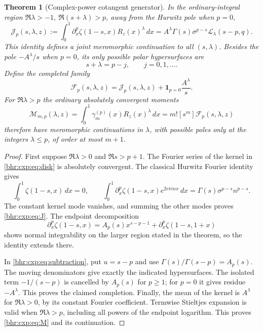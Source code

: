 \documentclass[11pt]{article}
\numberwithin{equation}{section}
\theoremstyle{plain}
\newtheorem{theorem}{Theorem}[section]
\theoremstyle{definition}
\theoremstyle{remark}
\begin{document}
\begin{theorem}[Complex-power cotangent generator]
\label{bhr:cxp:thm:generator}
In the ordinary-integral region
\(\Re\lambda>-1,\ \Re(s+\lambda)>p\), away from the Hurwitz
pole when \(p=0\),
\begin{equation}\label{bhr:cxp:eq:J}
 \mathcal J_p(s,\lambda,z):=
 \int_0^1\partial_x^p\zeta(1-s,x)R_z(x)^\lambda\,dx
 =A^\lambda\Gamma(s)\sigma^{p-s}
       \mathcal L_\lambda(s-p,q).
\end{equation}
This identity defines a joint meromorphic continuation to all
\((s,\lambda)\).  Besides the pole
\(-A^\lambda/s\) when \(p=0\), its only possible polar
hypersurfaces are
\[
 s+\lambda=p-j,\qquad j=0,1,\ldots.
\]
Define the completed family
\begin{equation}\label{bhr:cxp:eq:F}
 \mathcal F_p(s,\lambda,z)=
 \mathcal J_p(s,\lambda,z)
       +\mathbf1_{p=0}\frac{A^\lambda}{s}.
\end{equation}
For \(\Re\lambda>p\) the ordinary absolutely convergent moments
\begin{equation}\label{bhr:cxp:eq:M}
 \mathcal M_{m,p}(\lambda,z)=
 \int_0^1\gamma_m^{(p)}(x)R_z(x)^\lambda\,dx
 =m![s^m]\mathcal F_p(s,\lambda,z)
\end{equation}
therefore have meromorphic continuations in \(\lambda\), with
possible poles only at the integers \(\lambda\le p\), of order
at most \(m+1\).
\end{theorem}

\begin{proof}
First suppose \(\Re\lambda>0\) and \(\Re s>p+1\).
The Fourier series of the kernel in \eqref{bhr:cxp:eq:disk}
is absolutely convergent.  The classical Hurwitz Fourier identity
\cite[25.11.9]{bhr:DLMFZ} gives
\[
 \int_0^1\zeta(1-s,x)\,dx=0,\qquad
 \int_0^1\partial_x^p\zeta(1-s,x)
           e^{2\epsilon\pi i n x}\,dx
 =\Gamma(s)\sigma^{p-s}n^{p-s}.
\]
The constant kernel mode vanishes, and summing the other modes
proves \eqref{bhr:cxp:eq:J}.  The endpoint decomposition
\[
 \partial_x^p\zeta(1-s,x)
 =A_p(s)x^{s-p-1}
       +\partial_x^p\zeta(1-s,1+x)
\]
shows normal integrability on the larger region stated in the
theorem, so the identity extends there.

In \eqref{bhr:cxp:eq:subtraction}, put \(u=s-p\) and use
\(\Gamma(s)/\Gamma(s-p)=A_p(s)\).  The moving denominators
give exactly the indicated hypersurfaces.  The isolated term
\(-1/(s-p)\) is cancelled by \(A_p(s)\) for \(p\ge1\); for
\(p=0\) it gives residue \(-A^\lambda\).  This proves the
claimed completion.  Finally, the mean of the kernel is \(A^\lambda\)
for \(\Re\lambda>0\), by its constant Fourier coefficient.
Termwise Stieltjes expansion is valid when \(\Re\lambda>p\),
including all powers of the endpoint logarithm.  This proves
\eqref{bhr:cxp:eq:M} and its continuation.
\end{proof}
\end{document}
